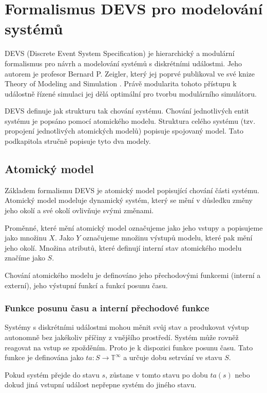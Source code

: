 \section{Formalismus DEVS pro modelování systémů}

DEVS (Discrete Event System Specification) je hierarchický a modulární formalismus pro návrh a modelování systémů s diskrétními událostmi. Jeho autorem je profesor Bernard P. Zeigler, který jej poprvé publikoval ve své knize Theory of Modeling and Simulation \cite{zeigler}. Právě modularita tohoto přístupu k událostně řízené simulaci jej dělá optimální pro tvorbu modulárního simulátoru.

DEVS definuje jak strukturu tak chování systému. Chování jednotlivých entit systému je popsáno pomocí atomického modelu. Struktura celého systému (tzv. propojení jednotlivých atomických modelů) popisuje spojovaný model. Tato podkapitola stručně popisuje tyto dva modely.

\subsection{Atomický model}

Základem formalismu DEVS je atomický model popisující chování části systému. Atomický model modeluje dynamický systém, který se mění v důsledku změny jeho okolí a své okolí ovlivňuje svými změnami.

Proměnné, které mění atomický model označujeme jako jeho vstupy a popisujeme jako množinu $X$. Jako $Y$ označujeme množinu výstupů modelu, které pak mění jeho okolí. Množina atributů, které definují interní stav atomického modelu značíme jako $S$.

Chování atomického modelu je definováno jeho přechodovými funkcemi (interní a externí), jeho výstupní funkcí a funkcí posunu času.

\subsubsection{Funkce posunu času a interní přechodové funkce}

Systémy s diskrétními událostmi mohou měnit svůj stav a produkovat výstup autonomně bez jakékoliv příčiny z vnějšího prostředí. Systém může rovněž reagovat na vstup se zpožděním. Proto je k dispozici funkce posunu času. Tato funkce je definována jako $ta:S \rightarrow \mathbb{T}^\infty$ a určuje dobu setrvání ve stavu $S$.

Pokud systém přejde do stavu $s$, zůstane v tomto stavu po dobu $ta(s)$ nebo dokud jiná vstupní událost nepřepne systém do jiného stavu.

